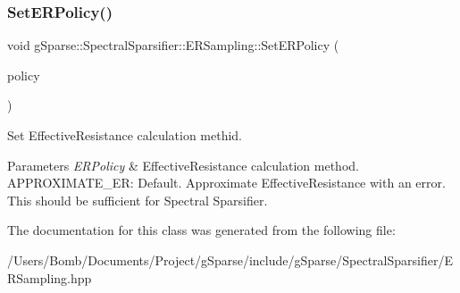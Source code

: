 \subsubsection{\texorpdfstring{Set\+E\+R\+Policy()}{SetERPolicy()}}
{\footnotesize\ttfamily void g\+Sparse\+::\+Spectral\+Sparsifier\+::\+E\+R\+Sampling\+::\+Set\+E\+R\+Policy (\begin{DoxyParamCaption}\item[{E\+R\+\_\+\+M\+E\+T\+H\+O\+DS}]{policy }\end{DoxyParamCaption})\hspace{0.3cm}{\ttfamily [inline]}}

Set Effective\+Resistance calculation methid.


\begin{DoxyParams}{Parameters}
{\em E\+R\+Policy} & Effective\+Resistance calculation method. A\+P\+P\+R\+O\+X\+I\+M\+A\+T\+E\+\_\+\+ER\+: Default. Approximate Effective\+Resistance with an error. This should be sufficient for Spectral Sparsifier. \\
\hline
\end{DoxyParams}


The documentation for this class was generated from the following file\+:\begin{DoxyCompactItemize}
\item 
/\+Users/\+Bomb/\+Documents/\+Project/g\+Sparse/include/g\+Sparse/\+Spectral\+Sparsifier/E\+R\+Sampling.\+hpp\end{DoxyCompactItemize}
